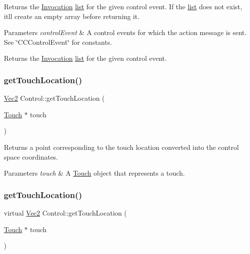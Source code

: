 Returns the \hyperlink{classInvocation}{Invocation} \hyperlink{protocollist-p}{list} for the given control event. If the \hyperlink{protocollist-p}{list} does not exist, it\textquotesingle{}ll create an empty array before returning it.


\begin{DoxyParams}{Parameters}
{\em control\+Event} & A control events for which the action message is sent. See \char`\"{}\+C\+C\+Control\+Event\char`\"{} for constants.\\
\hline
\end{DoxyParams}
\begin{DoxyReturn}{Returns}
the \hyperlink{classInvocation}{Invocation} \hyperlink{protocollist-p}{list} for the given control event. 
\end{DoxyReturn}
\mbox{\label{classControl_ab0067c6aeb440e1d42d6ebef4d85cd5c}} 
\subsubsection{\texorpdfstring{get\+Touch\+Location()}{getTouchLocation()}\hspace{0.1cm}{\footnotesize\ttfamily [1/2]}}
{\footnotesize\ttfamily \hyperlink{classVec2}{Vec2} Control\+::get\+Touch\+Location (\begin{DoxyParamCaption}\item[{\hyperlink{classTouch}{Touch} $\ast$}]{touch }\end{DoxyParamCaption})\hspace{0.3cm}{\ttfamily [virtual]}}

Returns a point corresponding to the touch location converted into the control space coordinates. 
\begin{DoxyParams}{Parameters}
{\em touch} & A \hyperlink{classTouch}{Touch} object that represents a touch. \\
\hline
\end{DoxyParams}
\mbox{\label{classControl_a226571b3103cb3289779243fee7f360b}} 
\subsubsection{\texorpdfstring{get\+Touch\+Location()}{getTouchLocation()}\hspace{0.1cm}{\footnotesize\ttfamily [2/2]}}
{\footnotesize\ttfamily virtual \hyperlink{classVec2}{Vec2} Control\+::get\+Touch\+Location (\begin{DoxyParamCaption}\item[{\hyperlink{classTouch}{Touch} $\ast$}]{touch }\end{DoxyParamCaption})\hspace{0.3cm}{\ttfamily [virtual]}}

